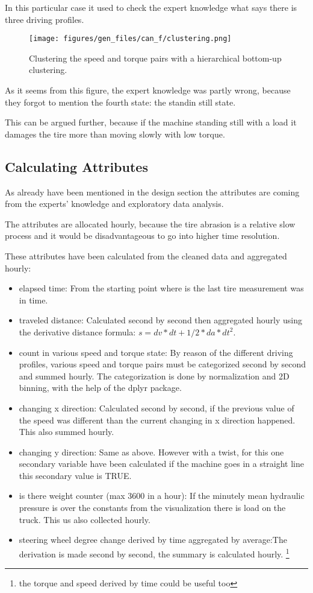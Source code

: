 	In this particular case it used to check the expert knowledge what says there is three driving profiles.
	\begin{figure}[H]
			\centering
			\texttt{[image: figures/gen\_files/can\_f/clustering.png]}
			\caption{Clustering the speed and torque pairs with a hierarchical bottom-up clustering.} 
	\end{figure}
	As it seems from this figure, the expert knowledge was partly wrong, because they forgot to mention the fourth state: the standin still state.

	This can be argued further, because if the machine standing still with a load it damages the tire more than moving slowly with low torque.
\subsection{Calculating Attributes}
As already have been mentioned in the design section the attributes are coming from the experts' knowledge and exploratory data analysis.

The attributes are allocated hourly, because the tire abrasion is a relative slow process and it would be disadvantageous to go into higher time resolution.

These attributes have been calculated from the cleaned data and aggregated hourly:
	\begin{itemize}
		\item{elapsed time:} From the starting point where is the last tire measurement was in time.
		\item{traveled distance:} Calculated second by second then aggregated hourly using the derivative distance formula: $s = dv*dt + 1/2*da*dt^2$.
		\item{count in various speed and torque state:} By reason of the different driving profiles, various speed and torque pairs must be categorized second by second and summed hourly. The categorization is done by normalization and 2D binning, with the help of the dplyr package.
		\item{changing x direction:} Calculated second by second, if the previous value of the speed was different than the current changing in x direction happened. This also summed hourly.
		\item{changing y direction:} Same as above. However with a twist, for this one secondary variable have been calculated if the machine goes in a straight line this secondary value is TRUE.
		\item{is there weight counter (max 3600 in a hour):} If the minutely mean hydraulic pressure is over the constants from the visualization there is load on the truck. This us also collected hourly.
		\item{steering wheel degree change derived by time aggregated by average:}The derivation is made second by second, the summary is calculated hourly.
		\footnote{the torque and speed derived by time could be useful too}
	\end{itemize}
